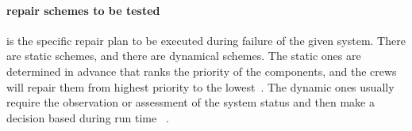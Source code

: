 \paragraph{repair schemes to be tested} is the specific repair plan to be executed during failure of the given system. There are static schemes, and there are dynamical schemes. The static ones are determined in advance that ranks the priority of the components, and the crews will repair them from highest priority to the lowest~\cite{}. The dynamic ones usually require the observation or assessment of the system status and then make a decision based during run time ~\cite{}.